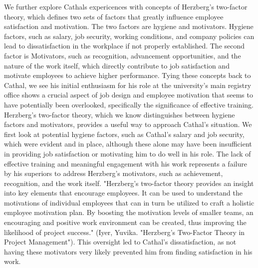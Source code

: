 \documentclass[12pt]{article}
\begin{document}
\begin{flushleft}
\bigbreak \noindent 
\hspace{\parindent} We further explore Cathals expericences with concepts of Herzberg's two-factor theory, which defines two sets of factors that greatly influence employee satisfaction and motivation. The two factors are hygiene and motivators. Hygiene factors, such as salary, job security, working conditions, and company policies can lead to dissatisfaction in the workplace if not properly established. The second factor is Motivators, such as recognition, advancement opportunities, and the nature of the work itself, which directly contribute to job satisfaction and motivate employees to achieve higher performance.
\bigbreak \noindent 
\hspace{\parindent} Tying these concepts back to Cathal, we see his initial enthusiasm for his role at the university's main registry office shows a crucial aspect of job design and employee motivation that seems to have potentially been overlooked, specifically the significance of effective training. Herzberg's two-factor theory, which we know distinguishes between hygiene factors and motivators, provides a useful way to approach Cathal's situation. We first look at potential hygiene factors, such as Cathal's salary and job security, which were evident and in place, although these alone may have been insufficient in providing job satisfaction or motivating him to do well in his role. The lack of effective training and meaningful engagement with his work represents a failure by his superiors to address Herzberg's motivators, such as achievement, recognition, and the work itself. "Herzberg's two-factor theory provides an insight into key elements that encourage employees. It can be used to understand the motivations of individual employees that can in turn be utilized to craft a holistic employee motivation plan. By boosting the motivation levels of smaller teams, an encouraging and positive work environment can be created, thus improving the likelihood of project success." (Iyer, Yuvika. "Herzberg's Two-Factor Theory in Project Management"). This oversight led to Cathal's dissatisfaction, as not having these motivators very likely prevented him from finding satisfaction in his work.
\bigbreak \noindent 

\end{flushleft}
\end{document}
